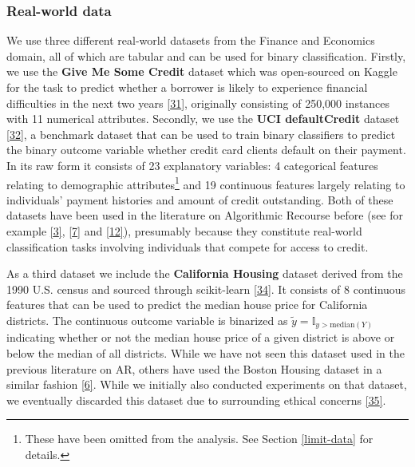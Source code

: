 \documentclass[conference,final,]{IEEEtran}
\theoremstyle{definition}
\theoremstyle{definition}
\theoremstyle{definition}
\theoremstyle{definition}
\theoremstyle{remark}
\begin{document}
\hypertarget{real-world-data}{%
\subsubsection{Real-world data}\label{real-world-data}}

We use three different real-world datasets from the Finance and Economics domain, all of which are tabular and can be used for binary classification. Firstly, we use the \textbf{Give Me Some Credit} dataset which was open-sourced on Kaggle for the task to predict whether a borrower is likely to experience financial difficulties in the next two years \protect\hyperlink{ref-kaggle2011give}{{[}31{]}}, originally consisting of 250,000 instances with 11 numerical attributes. Secondly, we use the \textbf{UCI defaultCredit} dataset \protect\hyperlink{ref-yeh2009comparisons}{{[}32{]}}, a benchmark dataset that can be used to train binary classifiers to predict the binary outcome variable whether credit card clients default on their payment. In its raw form it consists of 23 explanatory variables: 4 categorical features relating to demographic attributes\footnote{These have been omitted from the analysis. See Section \ref{limit-data} for details.} and 19 continuous features largely relating to individuals' payment histories and amount of credit outstanding. Both of these datasets have been used in the literature on Algorithmic Recourse before (see for example \protect\hyperlink{ref-pawelczyk2021carla}{{[}3{]}}, \protect\hyperlink{ref-joshi2019realistic}{{[}7{]}} and \protect\hyperlink{ref-ustun2019actionable}{{[}12{]}}), presumably because they constitute real-world classification tasks involving individuals that compete for access to credit.

As a third dataset we include the \textbf{California Housing} dataset derived from the 1990 U.S. census and sourced through scikit-learn \protect\hyperlink{ref-pace1997sparse}{{[}34{]}}. It consists of 8 continuous features that can be used to predict the median house price for California districts. The continuous outcome variable is binarized as \(\tilde{y}=\mathbb{I}_{y>\text{median}(Y)}\) indicating whether or not the median house price of a given district is above or below the median of all districts. While we have not seen this dataset used in the previous literature on AR, others have used the Boston Housing dataset in a similar fashion \protect\hyperlink{ref-schut2021generating}{{[}6{]}}. While we initially also conducted experiments on that dataset, we eventually discarded this dataset due to surrounding ethical concerns \protect\hyperlink{ref-carlisle2019racist}{{[}35{]}}.
\end{document}
